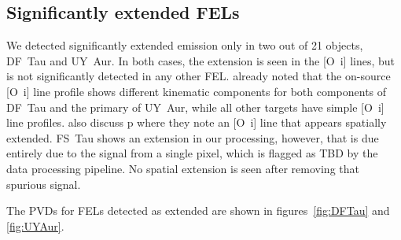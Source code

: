 \documentclass[twocolumn]{aastex62}
\begin{document}
\subsection{Significantly extended FELs}
We detected significantly extended emission only in two out of 21 objects, DF~Tau and UY~Aur. In both cases, the extension is seen in the [O~{\sc i}] lines, but is not significantly detected in any other FEL. \citet{2003ApJ...583..334H} already noted that the on-source [O~{\sc i}] line profile shows different kinematic components for both components of DF~Tau and the primary of UY~Aur, while all other targets have simple [O~{\sc i}] line profiles. \citet{2003ApJ...583..334H} also discuss  p where they note an [O~{\sc i}] line that appears spatially extended. FS~Tau shows an extension in our processing, however, that is due entirely due to the signal from a single pixel, which is flagged as TBD by the data processing pipeline. No spatial extension is seen after removing that spurious signal.

The PVDs for FELs detected as extended are shown in figures~\ref{fig:DFTau} and \ref{fig:UYAur}. 
\end{document}

